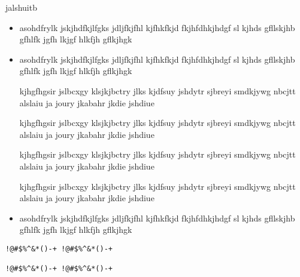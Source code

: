 \begin{itemize}
\begin{itemize}
\begin{breakbox}
jalshuitb
\begin{itemize}
\item asohdfrylk jskjhdfkjlfgks jdljfkjfhl kjfhkfkjd fkjhfdhkjhdgf
sl kjhds gfllskjhb gfhlfk jgfh lkjgf hlkfjh gflkjhgk
\item asohdfrylk jskjhdfkjlfgks jdljfkjfhl kjfhkfkjd fkjhfdhkjhdgf
sl kjhds gfllskjhb gfhlfk jgfh lkjgf hlkfjh gflkjhgk
\begin{breakbox}
kjhgfhgsir jslbcxgy klsjkjbctry jlks kjdfsuy
jshdytr sjbreyi smdkjywg nbcjtt alslaiu ja
joury jkabahr jkdie jshdiue

\bkcountfalse
\begin{breakbox}
kjhgfhgsir jslbcxgy klsjkjbctry jlks kjdfsuy
jshdytr sjbreyi smdkjywg nbcjtt alslaiu ja
joury jkabahr jkdie jshdiue

kjhgfhgsir jslbcxgy klsjkjbctry jlks kjdfsuy
jshdytr sjbreyi smdkjywg nbcjtt alslaiu ja
joury jkabahr jkdie jshdiue
\end{breakbox}

kjhgfhgsir jslbcxgy klsjkjbctry jlks kjdfsuy
jshdytr sjbreyi smdkjywg nbcjtt alslaiu ja
joury jkabahr jkdie jshdiue
\end{breakbox}

\item asohdfrylk jskjhdfkjlfgks jdljfkjfhl kjfhkfkjd fkjhfdhkjhdgf
sl kjhds gfllskjhb gfhlfk jgfh lkjgf hlkfjh gflkjhgk
\end{itemize}
\begin{verbatim}
!@#$%^&*()-+ !@#$%^&*()-+

!@#$%^&*()-+ !@#$%^&*()-+
\end{verbatim}
\end{breakbox}
\end{itemize}
\end{itemize}




